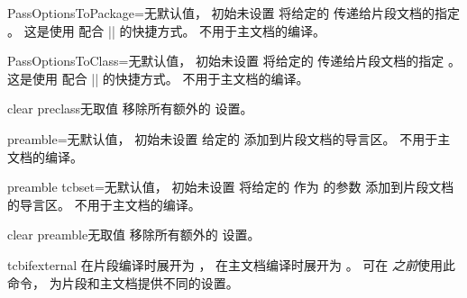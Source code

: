 \clearpage



\begin{extTcbKey}[][doc new=2015-05-05]{PassOptionsToPackage}{=}{无默认值，
  初始未设置}
将给定的 传递给片段文档的指定 。
这是使用  配合
|\PassOptionsToPackage| 的快捷方式。
不用于主文档的编译。
\end{extTcbKey}


\begin{extTcbKey}[][doc new=2015-05-05]{PassOptionsToClass}{=}{无默认值，
  初始未设置}
将给定的 传递给片段文档的指定 。
这是使用  配合
|\PassOptionsToClass| 的快捷方式。
不用于主文档的编译。
\end{extTcbKey}


\begin{extTcbKey}[][doc new=2015-05-05]{clear preclass}{}{无取值}
移除所有额外的  设置。
\end{extTcbKey}



\begin{extTcbKey}[][doc new=2015-03-11]{preamble}{=}{无默认值，
  初始未设置}
给定的 添加到片段文档的导言区。
不用于主文档的编译。
\end{extTcbKey}


\begin{extTcbKey}[][doc new=2015-05-05]{preamble tcbset}{=}{无默认值，
  初始未设置}
将给定的 作为  的参数
添加到片段文档的导言区。
不用于主文档的编译。
\end{extTcbKey}


\begin{extTcbKey}[][doc new=2015-03-16]{clear preamble}{}{无取值}
移除所有额外的  设置。
\end{extTcbKey}



\begin{docCommand}[doc new=2015-03-11]{tcbifexternal}{}
  在片段编译时展开为 ，
  在主文档编译时展开为 。
 可在  \emph{之前}使用此命令，
  为片段和主文档提供不同的设置。
\begin{dispListing}
\tcbifexternal{
  \usepackage{onlyforexternal}
}{
  \usepackage{onlyformain}
}
\end{dispListing}
\end{docCommand}



